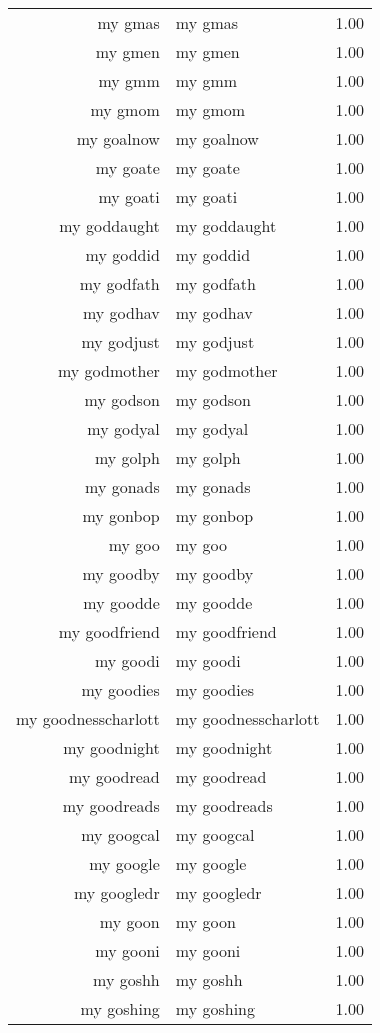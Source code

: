 \begin{table}[ht]
\begin{tabular}{rlr}
  my gmas & my gmas & 1.00 \\ 
  my gmen & my gmen & 1.00 \\ 
  my gmm & my gmm & 1.00 \\ 
  my gmom & my gmom & 1.00 \\ 
  my goalnow & my goalnow & 1.00 \\ 
  my goate & my goate & 1.00 \\ 
  my goati & my goati & 1.00 \\ 
  my goddaught & my goddaught & 1.00 \\ 
  my goddid & my goddid & 1.00 \\ 
  my godfath & my godfath & 1.00 \\ 
  my godhav & my godhav & 1.00 \\ 
  my godjust & my godjust & 1.00 \\ 
  my godmother & my godmother & 1.00 \\ 
  my godson & my godson & 1.00 \\ 
  my godyal & my godyal & 1.00 \\ 
  my golph & my golph & 1.00 \\ 
  my gonads & my gonads & 1.00 \\ 
  my gonbop & my gonbop & 1.00 \\ 
  my goo & my goo & 1.00 \\ 
  my goodby & my goodby & 1.00 \\ 
  my goodde & my goodde & 1.00 \\ 
  my goodfriend & my goodfriend & 1.00 \\ 
  my goodi & my goodi & 1.00 \\ 
  my goodies & my goodies & 1.00 \\ 
  my goodnesscharlott & my goodnesscharlott & 1.00 \\ 
  my goodnight & my goodnight & 1.00 \\ 
  my goodread & my goodread & 1.00 \\ 
  my goodreads & my goodreads & 1.00 \\ 
  my googcal & my googcal & 1.00 \\ 
  my google & my google & 1.00 \\ 
  my googledr & my googledr & 1.00 \\ 
  my goon & my goon & 1.00 \\ 
  my gooni & my gooni & 1.00 \\ 
  my goshh & my goshh & 1.00 \\ 
  my goshing & my goshing & 1.00 \\ 

\end{tabular}
\end{table}

